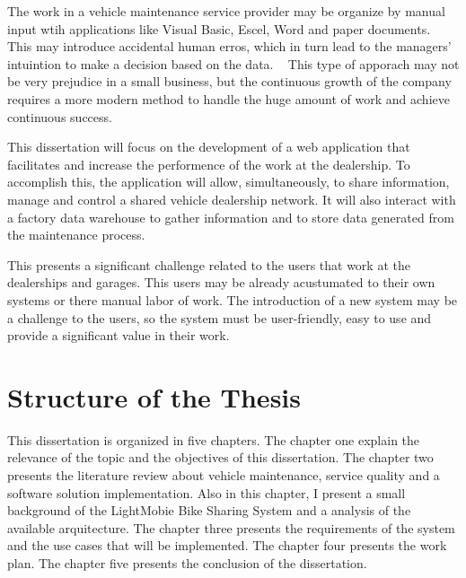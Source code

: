 The work in a vehicle maintenance service provider may be organize by manual input wtih applications like Visual Basic, Escel, Word and paper documents. ~\cite{MARS_MOTORS} 
This may introduce accidental human erros, which in turn lead to the managers' intuintion to make a decision based on the data. ~\cite{MARS_MOTORS}
This type of apporach may not be very prejudice in a small business, but the continuous growth of the company requires a more modern method to handle the huge amount of work and achieve continuous success. ~\cite{MARS_MOTORS}

This dissertation will focus on the development of a web application that facilitates and increase the performence of the work at the dealership.
To accomplish this, the application will allow, simultaneously, to share information, manage and control a shared vehicle dealership network.
It will also interact with a factory data warehouse to gather information and to store data generated from the maintenance process. 

This presents a significant challenge related to the users that work at the dealerships and garages. 
This users may be already acustumated to their own systems or there manual labor of work.  
The introduction of a new system may be a challenge to the users, so the system must be user-friendly, easy to use and provide a significant value in their work.

\section{Structure of the Thesis}

This dissertation is organized in five chapters. The chapter one explain the relevance of the topic and the objectives of this dissertation.
The chapter two presents the literature review about vehicle maintenance, service quality and a software solution implementation. 
Also in this chapter, I present a small background of the LightMobie Bike Sharing System and a analysis of the available arquitecture.
The chapter three presents the requirements of the system and the use cases that will be implemented.
The chapter four presents the work plan.
The chapter five presents the conclusion of the dissertation. 

